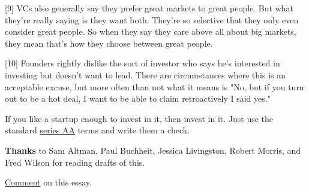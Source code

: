 [9] VCs also generally say they prefer great markets to great
                  people. But what they're really saying is they want both.
                  They're so selective that they only even consider great
                  people. So when they say they care above all about big
                  markets, they mean that's how they choose between great
                  people.

[10] Founders rightly dislike the sort of investor who says he's
                  interested in investing but doesn't want to lead. There are
                  circumstances where this is an acceptable excuse, but more
                  often than not what it means is "No, but if you turn out to be
                  a hot deal, I want to be able to claim retroactively I said
                  yes."

If you like a startup enough to invest in it,
                  then invest in it. Just use the standard
                  \href{http://ycombinator.com/seriesaa.html}{series AA}
                  terms and write them a check.


                  \textbf{Thanks} to Sam Altman, Paul Buchheit, Jessica
                  Livingston, Robert Morris, and Fred Wilson for reading drafts
                  of this.


                  \href{http://news.ycombinator.com/item?id=506671}{Comment}
                  on this essay.


              
            
          
            
              
                


                  
              
            
          
